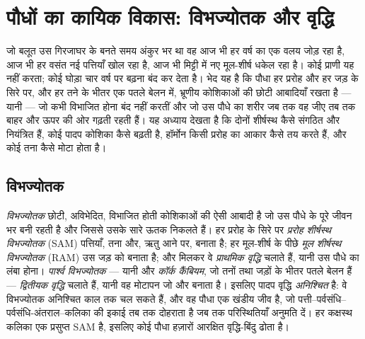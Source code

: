 \chapter{पौधों का कायिक विकास: विभज्योतक और वृद्धि}\label{ch:b2:plant-meristems}

जो बलूत उस गिरजाघर के बनते समय अंकुर भर था वह आज भी हर वर्ष  का एक
वलय जोड़ रहा है, आज भी हर वसंत नई पत्तियाँ खोल रहा है, आज भी मिट्टी में
नए मूल-शीर्ष धकेल रहा है। कोई प्राणी यह नहीं करता; कोई घोड़ा चार वर्ष
पर बढ़ना बंद कर देता है। भेद यह है कि पौधा हर प्ररोह और हर जड़ के सिरे
पर, और हर तने के भीतर एक पतले बेलन में, भ्रूणीय कोशिकाओं की छोटी आबादियाँ
रखता है --- यानी \emph{} --- जो कभी विभाजित होना बंद नहीं
करतीं और जो उस पौधे का शरीर जब तक वह जीए तब तक बाहर और ऊपर की ओर गढ़ती
रहती हैं। यह अध्याय देखता है कि दोनों शीर्षस्थ  कैसे संगठित और
नियंत्रित हैं, कोई पादप कोशिका कैसे बढ़ती है, हॉर्मोन किसी प्ररोह का आकार
कैसे तय करते हैं, और कोई तना कैसे मोटा होता है।

\section{विभज्योतक}

\begin{definition}[विभज्योतक और वृद्धि के दो प्रकार]\label{def:b2:plant-meristems:meristem}
\emph{विभज्योतक} छोटी, अविभेदित, विभाजित होती कोशिकाओं की ऐसी आबादी है
जो उस पौधे के पूरे जीवन भर बनी रहती है और जिससे उसके सारे ऊतक निकलते
हैं। हर प्ररोह के सिरे पर \emph{प्ररोह शीर्षस्थ विभज्योतक} (SAM)
पत्तियाँ, तना और, ऋतु आने पर,  बनाता है;
हर मूल-शीर्ष के पीछे \emph{मूल शीर्षस्थ विभज्योतक} (RAM) उस
जड़ को बनाता है; और मिलकर वे \emph{प्राथमिक वृद्धि} चलाते हैं, यानी उस
पौधे का लंबा होना। \emph{पार्श्व विभज्योतक} --- यानी \emph{} और \emph{कॉर्क कैंबियम}, जो तनों तथा जड़ों के भीतर पतले बेलन
हैं --- \emph{द्वितीयक वृद्धि} चलाते हैं, यानी वह मोटापन जो
 और  बनाता है। इसलिए पादप वृद्धि \emph{अनिश्चित} है:
वे विभज्योतक अनिश्चित काल तक चल सकते हैं, और वह पौधा एक खंडीय
जीव है, जो पत्ती--पर्वसंधि--पर्वसंधि-अंतराल--कलिका की इकाई तब तक दोहराता
है जब तक परिस्थितियाँ अनुमति दें। हर कक्षस्थ कलिका एक प्रसुप्त SAM है,
इसलिए कोई पौधा हज़ारों आरक्षित वृद्धि-बिंदु ढोता है।
\end{definition}


